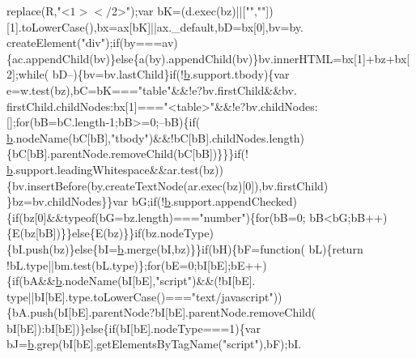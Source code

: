 \begin{DoxyCode}
      replace(R,\textcolor{stringliteral}{"<$1></$2>"});var bK=(d.exec(bz)||[\textcolor{stringliteral}{""},\textcolor{stringliteral}{""}])[1].toLowerCase(),bx=ax[bK]||ax.\_default,bD=bx[0],bv=by.
      createElement(\textcolor{stringliteral}{"div"});\textcolor{keywordflow}{if}(by===av)\{ac.appendChild(bv)\}\textcolor{keywordflow}{else}\{a(by).appendChild(bv)\}bv.innerHTML=bx[1]+bz+bx[2];\textcolor{keywordflow}{while}(
      bD--)\{bv=bv.lastChild\}\textcolor{keywordflow}{if}(!\hyperlink{docs_2_programmer's_manual_2html_2jquery_8js_aa4026ad5544b958e54ce5e106fa1c805}{b}.support.tbody)\{var e=w.test(bz),bC=bK===\textcolor{stringliteral}{"table"}&&!e?bv.firstChild&&bv.
      firstChild.childNodes:bx[1]===\textcolor{stringliteral}{"<table>"}&&!e?bv.childNodes:[];\textcolor{keywordflow}{for}(bB=bC.length-1;bB>=0;--bB)\{\textcolor{keywordflow}{if}(
      \hyperlink{docs_2_programmer's_manual_2html_2jquery_8js_aa4026ad5544b958e54ce5e106fa1c805}{b}.nodeName(bC[bB],\textcolor{stringliteral}{"tbody"})&&!bC[bB].childNodes.length)\{bC[bB].parentNode.removeChild(bC[bB])\}\}\}\textcolor{keywordflow}{if}(!
      \hyperlink{docs_2_programmer's_manual_2html_2jquery_8js_aa4026ad5544b958e54ce5e106fa1c805}{b}.support.leadingWhitespace&&ar.test(bz))\{bv.insertBefore(by.createTextNode(ar.exec(bz)[0]),bv.firstChild)
      \}bz=bv.childNodes\}\}var bG;\textcolor{keywordflow}{if}(!\hyperlink{docs_2_programmer's_manual_2html_2jquery_8js_aa4026ad5544b958e54ce5e106fa1c805}{b}.support.appendChecked)\{\textcolor{keywordflow}{if}(bz[0]&&typeof(bG=bz.length)===\textcolor{stringliteral}{"number"})\{\textcolor{keywordflow}{for}(bB=0;
      bB<bG;bB++)\{E(bz[bB])\}\}\textcolor{keywordflow}{else}\{E(bz)\}\}\textcolor{keywordflow}{if}(bz.nodeType)\{bI.push(bz)\}\textcolor{keywordflow}{else}\{bI=\hyperlink{docs_2_programmer's_manual_2html_2jquery_8js_aa4026ad5544b958e54ce5e106fa1c805}{b}.merge(bI,bz)\}\}\textcolor{keywordflow}{if}(bH)\{bF=\textcolor{keyword}{function}(
      bL)\{\textcolor{keywordflow}{return} !bL.type||bm.test(bL.type)\};\textcolor{keywordflow}{for}(bE=0;bI[bE];bE++)\{\textcolor{keywordflow}{if}(bA&&\hyperlink{docs_2_programmer's_manual_2html_2jquery_8js_aa4026ad5544b958e54ce5e106fa1c805}{b}.nodeName(bI[bE],\textcolor{stringliteral}{"script"})&&(!bI[bE].
      type||bI[bE].type.toLowerCase()===\textcolor{stringliteral}{"text/javascript"}))\{bA.push(bI[bE].parentNode?bI[bE].parentNode.removeChild(
      bI[bE]):bI[bE])\}\textcolor{keywordflow}{else}\{\textcolor{keywordflow}{if}(bI[bE].nodeType===1)\{var bJ=\hyperlink{docs_2_programmer's_manual_2html_2jquery_8js_aa4026ad5544b958e54ce5e106fa1c805}{b}.grep(bI[bE].getElementsByTagName(\textcolor{stringliteral}{"script"}),bF);bI.

\end{DoxyCode}
